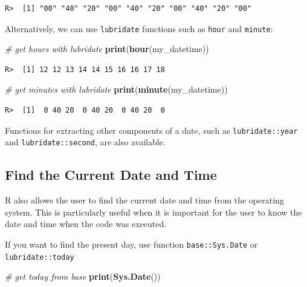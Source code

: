 \documentclass[
  12pt,
]{book}
\newenvironment{Shaded}{\begin{snugshade}}{\end{snugshade}}
\newcommand{\CommentTok}[1]{\textcolor[rgb]{0.37,0.37,0.37}{\textit{#1}}}
\newcommand{\KeywordTok}[1]{\textcolor[rgb]{0.27,0.27,0.27}{\textbf{#1}}}
\newcommand{\NormalTok}[1]{#1}
\begin{document}
\begin{verbatim}
R>  [1] "00" "40" "20" "00" "40" "20" "00" "40" "20" "00"
\end{verbatim}

Alternatively, we can use \texttt{lubridate} functions such as \texttt{hour} and \texttt{minute}:  

\begin{Shaded}
\begin{Highlighting}[]
\CommentTok{# get hours with lubridate}
\KeywordTok{print}\NormalTok{(}\KeywordTok{hour}\NormalTok{(my_datetime))}
\end{Highlighting}
\end{Shaded}

\begin{verbatim}
R>  [1] 12 12 13 14 14 15 16 16 17 18
\end{verbatim}

\begin{Shaded}
\begin{Highlighting}[]
\CommentTok{# get minutes with lubridate}
\KeywordTok{print}\NormalTok{(}\KeywordTok{minute}\NormalTok{(my_datetime))}
\end{Highlighting}
\end{Shaded}

\begin{verbatim}
R>  [1]  0 40 20  0 40 20  0 40 20  0
\end{verbatim}

Functions for extracting other components of a date, such as \texttt{lubridate::year} and \texttt{lubridate::second}, are also available.

\hypertarget{find-the-current-date-and-time}{%
\subsection{Find the Current Date and Time}\label{find-the-current-date-and-time}}

R also allows the user to find the current date and time from the operating system. This is particularly useful when it is important for the user to know the date and time when the code was executed.

If you want to find the present day, use function \texttt{base::Sys.Date} or \texttt{lubridate::today}  

\begin{Shaded}
\begin{Highlighting}[]
\CommentTok{# get today from base}
\KeywordTok{print}\NormalTok{(}\KeywordTok{Sys.Date}\NormalTok{())}
\end{Highlighting}
\end{Shaded}
\end{document}
